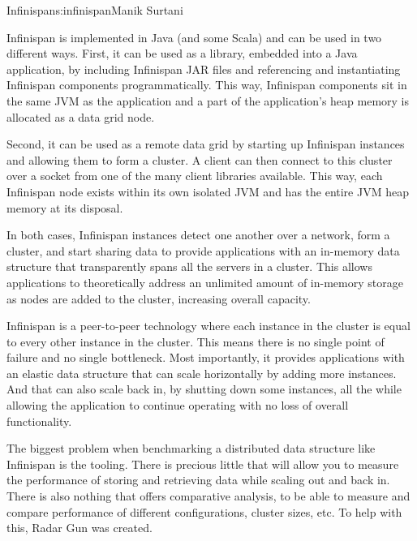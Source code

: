 \begin{aosachapter}{Infinispan}{s:infinispan}{Manik Surtani}

Infinispan is implemented in Java (and some Scala) and can be used in
two different ways. First, it can be used as a library, embedded into a
Java application, by including Infinispan JAR files and referencing and
instantiating Infinispan components programmatically. This way,
Infinispan components sit in the same JVM as the application and a part
of the application's heap memory is allocated as a data grid node.


Second, it can be used as a remote data grid by starting up Infinispan
instances and allowing them to form a cluster. A client can then connect
to this cluster over a socket from one of the many client libraries
available. This way, each Infinispan node exists within its own isolated
JVM and has the entire JVM heap memory at its disposal.



In both cases, Infinispan instances detect one another over a network,
form a cluster, and start sharing data to provide applications with an
in-memory data structure that transparently spans all the servers in a
cluster. This allows applications to theoretically address an unlimited
amount of in-memory storage as nodes are added to the cluster,
increasing overall capacity.

Infinispan is a peer-to-peer technology where each instance in the
cluster is equal to every other instance in the cluster. This means
there is no single point of failure and no single bottleneck. Most
importantly, it provides applications with an elastic data structure
that can scale horizontally by adding more instances. And that can also
scale back in, by shutting down some instances, all the while allowing
the application to continue operating with no loss of overall
functionality.


The biggest problem when benchmarking a distributed data structure like
Infinispan is the tooling. There is precious little that will allow you
to measure the performance of storing and retrieving data while scaling
out and back in. There is also nothing that offers comparative
analysis, to be able to measure and compare performance of different
configurations, cluster sizes, etc. To help with this, Radar Gun was
created.


\end{aosachapter}
